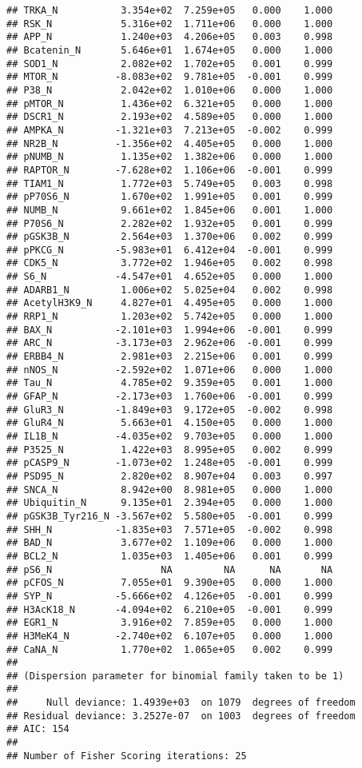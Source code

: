 \documentclass[]{article}
\begin{document}
\begin{verbatim}
## TRKA_N           3.354e+02  7.259e+05   0.000    1.000
## RSK_N            5.316e+02  1.711e+06   0.000    1.000
## APP_N            1.240e+03  4.206e+05   0.003    0.998
## Bcatenin_N       5.646e+01  1.674e+05   0.000    1.000
## SOD1_N           2.082e+02  1.702e+05   0.001    0.999
## MTOR_N          -8.083e+02  9.781e+05  -0.001    0.999
## P38_N            2.042e+02  1.010e+06   0.000    1.000
## pMTOR_N          1.436e+02  6.321e+05   0.000    1.000
## DSCR1_N          2.193e+02  4.589e+05   0.000    1.000
## AMPKA_N         -1.321e+03  7.213e+05  -0.002    0.999
## NR2B_N          -1.356e+02  4.405e+05   0.000    1.000
## pNUMB_N          1.135e+02  1.382e+06   0.000    1.000
## RAPTOR_N        -7.628e+02  1.106e+06  -0.001    0.999
## TIAM1_N          1.772e+03  5.749e+05   0.003    0.998
## pP70S6_N         1.670e+02  1.991e+05   0.001    0.999
## NUMB_N           9.661e+02  1.845e+06   0.001    1.000
## P70S6_N          2.282e+02  1.932e+05   0.001    0.999
## pGSK3B_N         2.564e+03  1.370e+06   0.002    0.999
## pPKCG_N         -5.983e+01  6.412e+04  -0.001    0.999
## CDK5_N           3.772e+02  1.946e+05   0.002    0.998
## S6_N            -4.547e+01  4.652e+05   0.000    1.000
## ADARB1_N         1.006e+02  5.025e+04   0.002    0.998
## AcetylH3K9_N     4.827e+01  4.495e+05   0.000    1.000
## RRP1_N           1.203e+02  5.742e+05   0.000    1.000
## BAX_N           -2.101e+03  1.994e+06  -0.001    0.999
## ARC_N           -3.173e+03  2.962e+06  -0.001    0.999
## ERBB4_N          2.981e+03  2.215e+06   0.001    0.999
## nNOS_N          -2.592e+02  1.071e+06   0.000    1.000
## Tau_N            4.785e+02  9.359e+05   0.001    1.000
## GFAP_N          -2.173e+03  1.760e+06  -0.001    0.999
## GluR3_N         -1.849e+03  9.172e+05  -0.002    0.998
## GluR4_N          5.663e+01  4.150e+05   0.000    1.000
## IL1B_N          -4.035e+02  9.703e+05   0.000    1.000
## P3525_N          1.422e+03  8.995e+05   0.002    0.999
## pCASP9_N        -1.073e+02  1.248e+05  -0.001    0.999
## PSD95_N          2.820e+02  8.907e+04   0.003    0.997
## SNCA_N           8.942e+00  8.981e+05   0.000    1.000
## Ubiquitin_N      9.135e+01  2.394e+05   0.000    1.000
## pGSK3B_Tyr216_N -3.567e+02  5.580e+05  -0.001    0.999
## SHH_N           -1.835e+03  7.571e+05  -0.002    0.998
## BAD_N            3.677e+02  1.109e+06   0.000    1.000
## BCL2_N           1.035e+03  1.405e+06   0.001    0.999
## pS6_N                   NA         NA      NA       NA
## pCFOS_N          7.055e+01  9.390e+05   0.000    1.000
## SYP_N           -5.666e+02  4.126e+05  -0.001    0.999
## H3AcK18_N       -4.094e+02  6.210e+05  -0.001    0.999
## EGR1_N           3.916e+02  7.859e+05   0.000    1.000
## H3MeK4_N        -2.740e+02  6.107e+05   0.000    1.000
## CaNA_N           1.770e+02  1.065e+05   0.002    0.999
## 
## (Dispersion parameter for binomial family taken to be 1)
## 
##     Null deviance: 1.4939e+03  on 1079  degrees of freedom
## Residual deviance: 3.2527e-07  on 1003  degrees of freedom
## AIC: 154
## 
## Number of Fisher Scoring iterations: 25
\end{verbatim}
\end{document}
